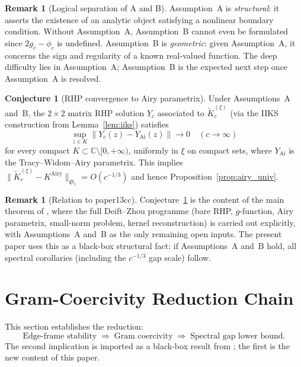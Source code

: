 \documentclass[12pt,a4paper]{amsart}
\theoremstyle{definition}
\newtheorem{remark}[theorem]{Remark}
\newtheorem{conjecture}[theorem]{Conjecture}
\begin{document}
\begin{remark}[Logical separation of A and B]
Assumption~A is \emph{structural}: it asserts the existence of an
analytic object satisfying a nonlinear boundary condition.
Without Assumption~A, Assumption~B cannot even be formulated
since $2g_c - \phi_c$ is undefined.
Assumption~B is \emph{geometric}: given Assumption~A, it concerns
the sign and regularity of a known real-valued function.
The deep difficulty lies in Assumption~A;
Assumption~B is the expected next step once Assumption~A
is resolved.
\end{remark}

\begin{conjecture}[RHP convergence to Airy parametrix]%
\label{conj:airy_rhp}
Under Assumptions~A and~B, the $2\times 2$ matrix RHP
solution $Y_c$ associated to $\widetilde{K}_c^{(\xi)}$
(via the IIKS construction from Lemma~\ref{lem:iiks})
satisfies
\[
  \sup_{z\in K}\|Y_c(z) - Y_{\mathrm{Ai}}(z)\|
  \longrightarrow 0
  \quad (c\to\infty)
\]
for every compact $K\subset\mathbb{C}\setminus[0,+\infty)$,
uniformly in $\xi$ on compact sets,
where $Y_{\mathrm{Ai}}$ is the Tracy--Widom--Airy parametrix.
This implies
$\|\widetilde{K}_c^{(\xi)} - K^{\mathrm{Airy}}\|_{\mathfrak{S}_1}
= O(c^{-1/3})$
and hence Proposition~\ref{prop:airy_univ}.
\end{conjecture}

\begin{remark}[Relation to paper13cc]
Conjecture~\ref{conj:airy_rhp} is the content of
the main theorem of \cite{Paper13cc}, where the full
Deift--Zhou programme (bare RHP, $g$-function,
Airy parametrix, small-norm problem, kernel reconstruction)
is carried out explicitly, with Assumptions~A and~B
as the only remaining open inputs.
The present paper uses this as a black-box structural fact:
if Assumptions~A and~B hold, all spectral corollaries
(including the $c^{-1/3}$ gap scale) follow.
\end{remark}

\section{Gram-Coercivity Reduction Chain}\label{sec:gram_gap}

This section establishes the reduction:
\[
  \text{Edge-frame stability}
  \;\Longrightarrow\;
  \text{Gram coercivity}
  \;\Longrightarrow\;
  \text{Spectral gap lower bound}.
\]
The second implication is imported as a black-box result
from \cite{Paper13b}; the first is the new content of this paper.
\end{document}
